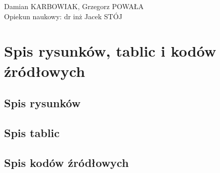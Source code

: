 \documentclass[a4paper,12pt]{article}
\begin{document}
\lstset{numbers=left, stepnumber=1, numbersep=10pt, frame=single}
\lstset{frameround=tttt}
\renewcommand{\lstlistlistingname}{\vspace*{-13mm}}
\renewcommand{\listfigurename}{\vspace*{-13mm}}
\renewcommand{\listtablename}{\vspace*{-13mm}}
\renewcommand*{\refname}{\vspace*{-13mm}}
\renewcommand{\lstlistingname}{Kod źródłowy} 

\newcommand{\rowstyle}[1]{\gdef\currentrowstyle{#1}%
#1\ignorespaces
}

\thispagestyle{plain}
\noindent Damian KARBOWIAK, Grzegorz POWAŁA \\
Opiekun naukowy: dr inż Jacek STÓJ



\tableofcontents
{}
\clearpage


\section{Spis rysunków, tablic i kodów źródłowych}
\subsection{Spis rysunków}
\newlength{\fig}
\settowidth{\fig}{Rysunek\,99:~}
\renewcommand*\numberline[1]{\llap{\makebox[\fig][l]{Rysunek\,#1:~}}}
\makeatletter
\renewcommand*\l@figure[2]{\leftskip\fig\noindent#1\par}
\renewcommand*\l@figure{\@dottedtocline{1}{3cm}{0cm}}
\makeatother
\listoffigures

\subsection{Spis tablic}
\settowidth{\fig}{Tablica\,99:~}
\renewcommand*\numberline[1]{\llap{\makebox[\fig][l]{Tablica\,#1:~}}}
\makeatletter
\renewcommand*\l@table[2]{\leftskip\fig\noindent#1\par}
\renewcommand*\l@table{\@dottedtocline{1}{2.8cm}{0cm}}
\makeatother
\listoftables
\subsection{Spis kodów źródłowych}
\settowidth{\fig}{Kod źródłowy,99:~}
\renewcommand*\numberline[1]{\llap{\makebox[\fig][l]{Kod źródłowy\,#1:~}}}
\makeatletter
\renewcommand*\l@lstlisting[2]{\leftskip\fig\noindent#1\par}
\renewcommand*\l@lstlisting{\@dottedtocline{1}{4.1cm}{0cm}}
\makeatother
\lstlistoflistings
\end{document}
